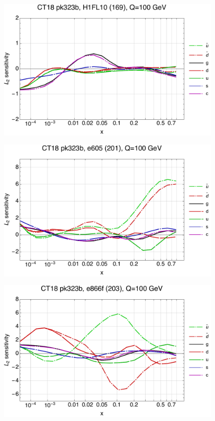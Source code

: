 \documentclass[10pt,aps,prd,floatfix,titlepage]{revtex4}
\begin{document}
\clearpage
\begin{figure}
\includegraphics[width=\textwidth,height=0.44\textheight,keepaspectratio]{1/169_ct18nn_L2_q100_Sf_1.pdf}
\caption{}
\end{figure}
\begin{figure}
\includegraphics[width=\textwidth,height=0.44\textheight,keepaspectratio]{1/201_ct18nn_L2_q100_Sf_1.pdf}
\caption{}
\end{figure}
\clearpage
\begin{figure}
\includegraphics[width=\textwidth,height=0.44\textheight,keepaspectratio]{1/203_ct18nn_L2_q100_Sf_1.pdf}
\caption{}
\end{figure}
\end{document}
